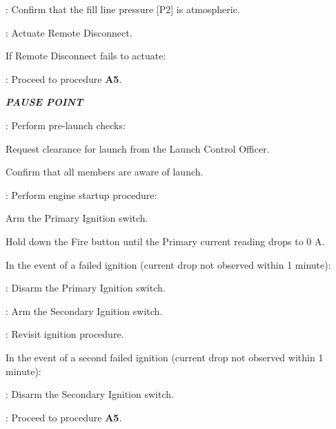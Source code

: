 \begin{checklist}
    \item \control{}: Confirm that the fill line pressure [P2] is atmospheric.
    \item \control{}: Actuate Remote Disconnect.
     \begin{checklist}[label=$\bullet$]
        \item If Remote Disconnect fails to actuate:
        \begin{checklist}
            \item \ops{}: Proceed to procedure \textbf{A5}.
        \end{checklist}
    \end{checklist}
    \item \textbf{\textit{PAUSE POINT}}
    \item \ops: Perform pre-launch checks:
    \begin{checklist}
        \item Request clearance for launch from the Launch Control Officer.
        \item Confirm that all members are aware of launch.
    \end{checklist}    
    \item \primary{}: Perform engine startup procedure:
    \begin{checklist}
        \item Arm the Primary Ignition switch.
        \item Hold down the Fire button until the Primary current reading drops to 0 A.
        \begin{checklist}[label=$\bullet$]
            \item In the event of a failed ignition (current drop not observed within 1 minute):
            \begin{checklist}
                \item \primary: Disarm the Primary Ignition switch.
                \item \primary: Arm the Secondary Ignition switch.
                \item \ops: Revisit ignition procedure.
            \end{checklist}
            \item In the event of a second failed ignition (current drop not observed within 1 minute):
            \begin{checklist}
                \item \primary: Disarm the Secondary Ignition switch.
                \item \ops: Proceed to procedure \textbf{A5}.

\end{checklist}
\end{checklist}
\end{checklist}
\end{checklist}
